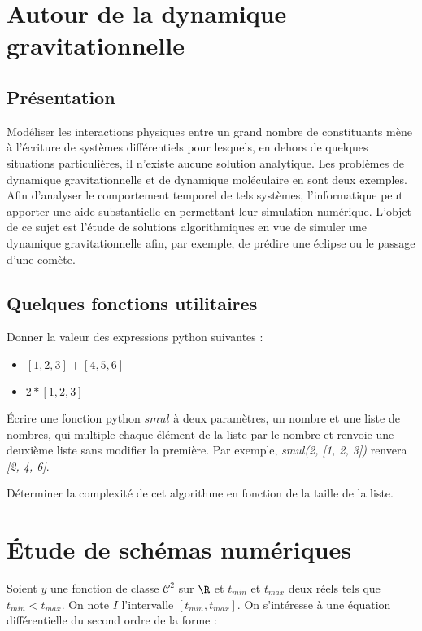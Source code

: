\section{Autour de la dynamique gravitationnelle}

\subsection{Présentation}
Modéliser les interactions physiques entre un grand nombre de constituants mène à l'écriture de systèmes différentiels pour lesquels, en dehors de quelques situations particulières, il n'existe aucune solution analytique. Les problèmes de dynamique gravitationnelle et de dynamique moléculaire en sont deux exemples. Afin d'analyser le comportement temporel de tels systèmes, l'informatique peut apporter une aide substantielle en permettant leur simulation numérique. L'objet de ce sujet est l'étude de solutions algorithmiques en vue de simuler une dynamique gravitationnelle afin, par exemple, de prédire une éclipse ou le passage d'une comète.

\subsection{Quelques fonctions utilitaires}

\question{}Donner la valeur des expressions python suivantes :
\begin{itemize}
\item $[1, 2, 3] + [4, 5, 6]$
\item $2 * [1, 2, 3]$
\end{itemize}


\question{} Écrire une fonction python $smul$ à deux paramètres, un nombre et une liste de nombres, qui multiple chaque élément de la liste par le nombre et renvoie une deuxième liste sans modifier la première. 
Par exemple, \textit{smul(2, [1, 2, 3])} renvera \textit{[2, 4, 6]}.

\question{} Déterminer la complexité de cet algorithme en fonction de la taille de la liste.


\section{Étude de schémas numériques}

Soient $y$ une fonction de classe $\mathcal{C}^2$ sur $\R$ et $t_{min}$ et $t_{max}$ deux réels tels que $t_{min} < t_{max}$. On note $I$ l'intervalle $\left[t_{min}, t_{max}\right]$. 
On s'intéresse à une équation différentielle du second ordre de la forme :

